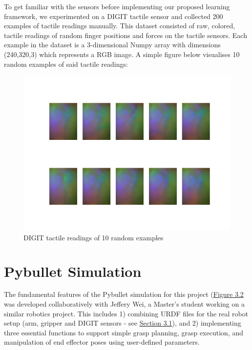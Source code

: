 \documentclass[12pt, a4paper]{report}
\theoremstyle{definition}
\begin{document}
To get familiar with the sensors before implementing our proposed learning framework, we experimented on a DIGIT tactile sensor and collected 200 examples of tactile readings manually. This dataset consisted of raw, colored, tactile readings of random finger positions and forces on the tactile sensors. Each example in the dataset is a 3-dimensional Numpy array with dimensions (240,320,3) which represents a RGB image. A simple figure below visualises 10 random examples of said tactile readings:
\begin{figure}[H]
    \centering
    \includegraphics[scale=0.4]{docs/Project Report/Media/tacto_testing.png}
    \caption{DIGIT tactile readings of 10 random examples}
    \label{fig:digit\_readings}
\end{figure}


\section{Pybullet Simulation}
\label{sec:3.3}
The fundamental features of the Pybullet simulation for this project (\hyperref[fig:pbSimScreenshot]{Figure 3.2} was developed collaboratively with Jeffery Wei, a Master's student working on a similar robotics project. This includes 1) combining URDF files for the real robot setup (arm, gripper and DIGIT sensors - see \hyperref[sec:3.1]{Section 3.1}), and 2) implementing three essential functions to support simple grasp planning, grasp execution, and manipulation of end effector poses using user-defined parameters.
\end{document}
